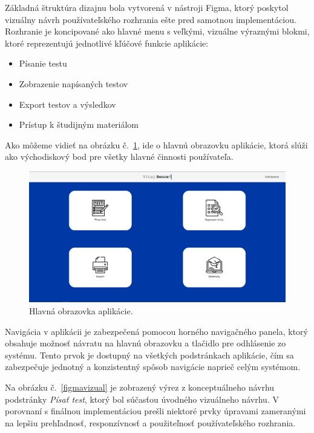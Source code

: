 Základná štruktúra dizajnu bola vytvorená v nástroji Figma, ktorý poskytol vizuálny návrh používateľského rozhrania ešte pred samotnou implementáciou. Rozhranie je koncipované ako hlavné menu s veľkými, vizuálne výraznými blokmi, ktoré reprezentujú jednotlivé kľúčové funkcie aplikácie:
\begin{itemize} 
  \item Písanie testu 
  \item Zobrazenie napísaných testov 
  \item Export testov a výsledkov 
  \item Prístup k študijným materiálom 
\end{itemize}

Ako môžeme vidieť na obrázku č.~\ref{homescreen}, ide o hlavnú obrazovku aplikácie, ktorá slúži ako východiskový bod pre všetky hlavné činnosti používateľa.

\begin{figure}[h!]
  \centering
  \includegraphics[width=16cm]{img/homepage.png}
  \caption{Hlavná obrazovka aplikácie.}
  \label{homescreen}
\end{figure} 

Navigácia v aplikácii je zabezpečená pomocou horného navigačného panela, ktorý obsahuje možnosť návratu na hlavnú obrazovku a tlačidlo pre odhlásenie zo systému. Tento prvok je dostupný na všetkých podstránkach aplikácie, čím sa zabezpečuje jednotný a konzistentný spôsob navigácie naprieč celým systémom.

Na obrázku č.~\ref{figmavizual} je zobrazený výrez z konceptuálneho návrhu podstránky \textit{Písať test}, ktorý bol súčasťou úvodného vizuálneho návrhu. 
V porovnaní s finálnou implementáciou prešli niektoré prvky úpravami zameranými na lepšiu prehľadnosť, responzívnosť a použiteľnosť používateľského rozhrania.

